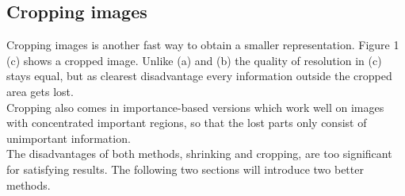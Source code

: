 \subsection{Cropping images}
Cropping images is another fast way to obtain a smaller representation. Figure 1 (c) shows a cropped image. Unlike (a) and (b) the quality of resolution in (c) stays equal, but as clearest disadvantage every information outside the cropped area gets lost. \\
Cropping also comes in importance-based versions which work well on images with concentrated important regions, so that the lost parts only consist of unimportant information.\\
The disadvantages of both methods, shrinking and cropping, are too significant for satisfying results. The following two sections will introduce two better methods.
